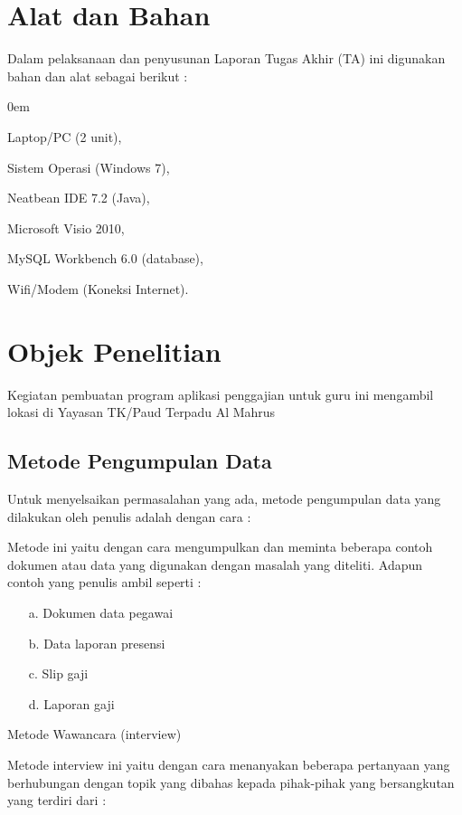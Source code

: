 \documentclass{jtetiproposalskripsi}
\begin{document}
\section{Alat dan Bahan}
Dalam pelaksanaan dan penyusunan Laporan Tugas Akhir (TA) ini digunakan bahan dan alat sebagai berikut :

\vspace{-0.5cm}

\begin{enumerate}[a.]
\begin{singlespace}
\itemsep0em
\item Laptop/PC (2 unit),
\item Sistem Operasi (Windows 7),
\item Neatbean IDE 7.2 (Java),
\item Microsoft Visio 2010,
\item MySQL Workbench 6.0 (database),
\item Wifi/Modem (Koneksi Internet).
\end{singlespace}
\end{enumerate}

\section{Objek Penelitian}

Kegiatan pembuatan program aplikasi penggajian untuk guru ini mengambil lokasi di Yayasan TK/Paud Terpadu Al Mahrus
\subsection{Metode Pengumpulan Data}

Untuk menyelsaikan permasalahan yang ada, metode pengumpulan data yang dilakukan oleh penulis adalah dengan cara :

Metode ini yaitu dengan cara mengumpulkan dan meminta beberapa contoh dokumen atau data yang digunakan  dengan masalah yang diteliti. Adapun contoh yang penulis ambil seperti :
\begin{itemize}
\item[a.]	Dokumen data pegawai
\item[b.]   Data laporan presensi
\item[c.]	Slip gaji 
\item[d.]	Laporan gaji
\end{itemize}

Metode Wawancara (interview)

Metode interview ini yaitu dengan cara menanyakan beberapa pertanyaan yang berhubungan dengan topik yang dibahas kepada pihak-pihak yang bersangkutan yang terdiri dari :
\end{document}
